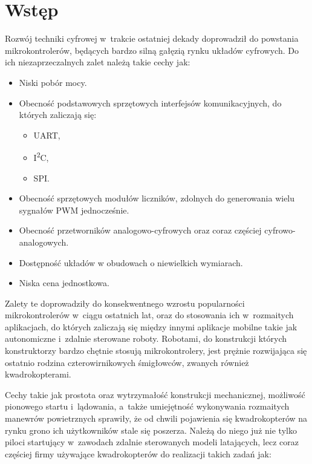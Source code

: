 
\chapter{Wstęp} %

\label{Chapter1} %


Rozwój techniki cyfrowej w~trakcie ostatniej dekady doprowadził do powstania mikrokontrolerów, będących bardzo silną gałęzią rynku układów cyfrowych. Do ich niezaprzeczalnych zalet należą takie cechy jak:

\begin{itemize}
	\item Niski pobór mocy.
	\item Obecność podstawowych sprzętowych interfejsów komunikacyjnych, do których zaliczają się:
		\begin{itemize}
			\item UART,
			\item I\textsuperscript{2}C,
			\item SPI.
		\end{itemize}
	\item Obecność sprzętowych modułów liczników, zdolnych do generowania wielu sygnałów PWM jednocześnie.
	\item Obecność przetworników analogowo-cyfrowych oraz coraz częściej cyfrowo-analogowych.
	\item Dostępność układów w obudowach o niewielkich wymiarach.
	\item Niska cena jednostkowa.
\end{itemize}

Zalety te doprowadziły do konsekwentnego wzrostu popularności mikrokontrolerów w~ciągu ostatnich lat, oraz do stosowania ich w~rozmaitych aplikacjach, do których zaliczają się między innymi aplikacje mobilne takie jak autonomiczne i~zdalnie sterowane roboty.
Robotami, do konstrukcji których konstruktorzy bardzo chętnie stosują mikrokontrolery, jest prężnie rozwijająca się ostatnio rodzina czterowirnikowych śmigłowców, zwanych również kwadrokopterami. 

Cechy takie jak prostota oraz wytrzymałość konstrukcji mechanicznej, możliwość pionowego startu i~lądowania, a~także umiejętność wykonywania rozmaitych manewrów powietrznych sprawiły, że od chwili pojawienia się kwadrokopterów na rynku grono ich użytkowników stale się poszerza.
Należą do niego już nie tylko piloci startujący w~zawodach zdalnie sterowanych modeli latających, lecz coraz częściej firmy używające kwadrokopterów do realizacji takich zadań jak:

